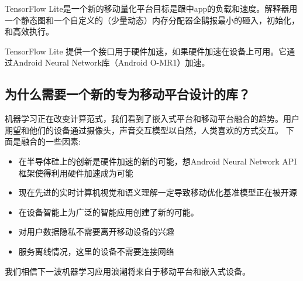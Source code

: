TensorFlow Lite是一个新的移动量化平台目标是跟中app的负载和速度。解释器用一个静态图和一个自定义的（少量动态）内存分配器企鹅报最小的砸入，初始化，和高效执行。

TensorFlow Lite 提供一个接口用于硬件加速，如果硬件加速在设备上可用。它通过Android Neural Network库（Android O-MR1）加速。
\subsection{为什么需要一个新的专为移动平台设计的库？}
机器学习正在改变计算范式，我们看到了嵌入式平台和移动平台融合的趋势。用户期望和他们的设备通过摄像头，声音交互模型以自然，人类喜欢的方式交互。
下面是融合的一些因素:
\begin{itemize}
\item 在半导体硅上的创新是硬件加速的新的可能，想Android Neural Network API框架使得利用硬件加速成为可能
\item 现在先进的实时计算机视觉和语义理解一定导致移动优化基准模型正在被开源
\item 在设备智能上为广泛的智能应用创建了新的可能。
\item 对用户数据隐私不需要离开移动设备的兴趣
\item 服务离线情况，这里的设备不需要连接网络
\end{itemize}
我们相信下一波机器学习应用浪潮将来自于移动平台和嵌入式设备。
